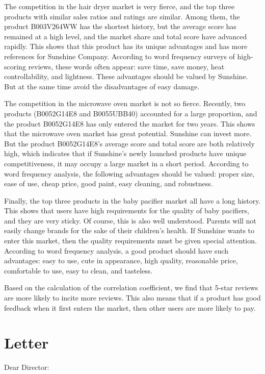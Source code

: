\documentclass{mcmthesis}
\begin{document}
	The competition in the hair dryer market is very fierce, and the top three products with similar sales ratios and ratings are similar. Among them, the product B003V264WW has the shortest history, but the average score has remained at a high level, and the market share and total score have advanced rapidly. This shows that this product has its unique advantages and has more references for Sunshine Company. According to word frequency surveys of high-scoring reviews, these words often appear: save time, save money, heat controllability, and lightness. These advantages should be valued by Sunshine. But at the same time avoid the disadvantages of easy damage.
	
	The competition in the microwave oven market is not so fierce. Recently, two products (B0052G14E8 and B0055UBB40) accounted for a large proportion, and the product B0052G14E8 has only entered the market for two years. This shows that the microwave oven market has great potential. Sunshine can invest more. But the product B0052G14E8's average score and total score are both relatively high, which indicates that if Sunshine's newly launched products have unique competitiveness, it may occupy a large market in a short period. According to word frequency analysis, the following advantages should be valued: proper size, ease of use, cheap price, good paint, easy cleaning, and robustness.
	
	Finally, the top three products in the baby pacifier market all have a long history. This shows that users have high requirements for the quality of baby pacifiers, and they are very sticky. Of course, this is also well understood. Parents will not easily change brands for the sake of their children's health. If Sunshine wants to enter this market, then the quality requirements must be given special attention. According to word frequency analysis, a good product should have such advantages: easy to use, cute in appearance, high quality, reasonable price, comfortable to use, easy to clean, and tasteless.
	
	Based on the calculation of the correlation coefficient, we find that 5-star reviews are more likely to incite more reviews. This also means that if a product has good feedback when it first enters the market, then other users are more likely to pay.
	
	\newpage
	
	\section{Letter}
	\begin{flushleft}
		Dear Director:
	\end{flushleft}
\end{document}
